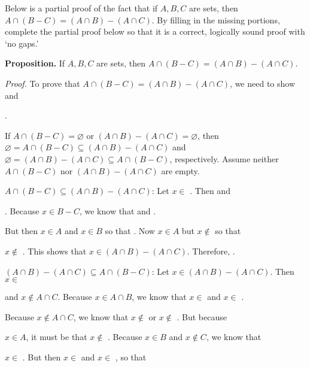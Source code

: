 \documentclass[11pt,letterpaper]{article}
\newcommand{\blank}[1]{\underline{\hspace{#1}}} %
\begin{document}
\newpage



 Below is a partial proof of the fact that if $A, B, C$ are sets, then $A \cap (B - C)= (A \cap B) - (A \cap C)$. By filling in the missing portions, complete the partial proof below so that it is a correct, logically sound proof with `no gaps.' \pspace

\noindent \textbf{Proposition.} If $A, B, C$ are sets, then $A \cap (B - C)= (A \cap B) - (A \cap C)$. \pspace

\textit{Proof.} To prove that $A \cap (B - C)= (A \cap B) - (A \cap C)$, we need to show \blank{3cm} and \pspace

\underline{\hspace{3cm}}. 

If $A \cap (B - C)= \varnothing$ or $(A \cap B) - (A \cap C)= \varnothing$, then $\varnothing= A \cap (B - C) \subseteq (A \cap B) - (A \cap C)$ and $\varnothing= (A \cap B) - (A \cap C) \subseteq A \cap (B - C)$, respectively. Assume neither $A \cap (B - C)$ nor $(A \cap B) - (A \cap C)$ are empty. 

$A \cap (B - C) \subseteq (A \cap B) - (A \cap C)$: Let $x \in $ \blank{3cm}. Then \blank{3cm} and \pspace

\underline{\hspace{3cm}}. Because $x \in B - C$, we know that \blank{3cm} and \blank{3cm}. \pspace

But then $x \in A$ and $x \in B$ so that \blank{3cm}. Now $x \in A$ but $x \notin$ \blank{3cm} so that \pspace

$x \notin$ \blank{3cm}. This shows that $x \in (A \cap B) - (A \cap C)$. Therefore, \blank{3cm}. 

$(A \cap B) - (A \cap C) \subseteq A \cap (B - C)$: Let $x \in (A \cap B) - (A \cap C)$. Then $x \in$ \blank{3cm} \pspace

and $x \notin A \cap C$. Because $x \in A \cap B$, we know that $x \in$ \blank{3cm} and $x \in$ \blank{3cm}. \pspace

Because $x \notin A \cap C$, we know that $x \notin$ \blank{3cm} or $x \notin$ \blank{3cm}. But because \pspace

$x \in A$, it must be that $x \notin$ \blank{3cm}. Because $x \in B$ and $x \notin C$, we know that \pspace

$x \in$ \blank{3cm}. But then $x \in$ \blank{3cm}  and $x \in$ \blank{3cm}, so that \pspace
\end{document}
